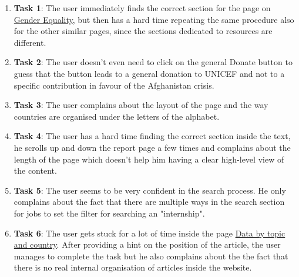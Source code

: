 \begin{enumerate}
	\item \textbf{Task 1}: The user immediately finds the correct section for the page on \href{https://www.unicef.org/gender-equality}{Gender Equality}, but then has a hard time repeating the same procedure also for the other similar pages, since the sections dedicated to resources are different.
	\item \textbf{Task 2}: The user doesn't even need to click on the general Donate button to guess that the button leads to a general donation to UNICEF and not to a specific contribution in favour of the Afghanistan crisis.
	\item \textbf{Task 3}: The user complains about the layout of the page and the way countries are organised under the letters of the alphabet.
	\item \textbf{Task 4}: The user has a hard time finding the correct section inside the text, he scrolls up and down the report page a few times and complains about the length of the page which doesn't help him having a clear high-level view of the content.
	\item \textbf{Task 5}: The user seems to be very confident in the search process. He only complains about the fact that there are multiple ways in the search section for jobs to set the filter for searching an "internship".
	\item \textbf{Task 6}: The user gets stuck for a lot of time inside the page \href{https://data.unicef.org/?_gl=1\%2A1he5ywc\%2A_ga\%2AMTEzMTU1MTkxOS4xNzEwMTk2NDI2\%2A_ga_ZEPV2PX419\%2AMTcxMjYxMDM0Ni4yNi4xLjE3MTI2MTUzNDEuNjAuMC4w}{Data by topic and country}. After providing a hint on the position of the article, the user manages to complete the task but he also complains about the the fact that there is no real internal organisation of articles inside the website.
	
\end{enumerate}



\vspace{1cm}


